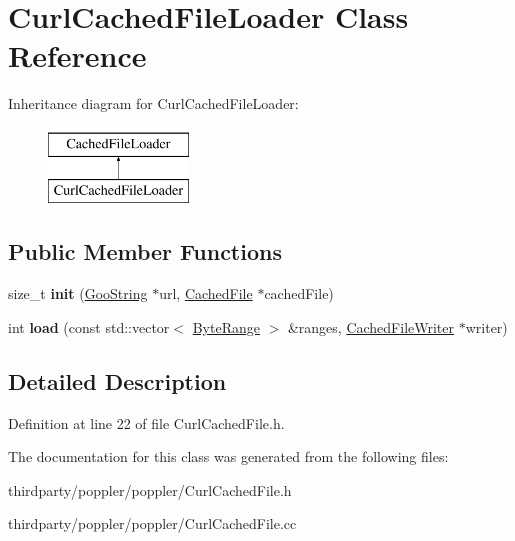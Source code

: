 \hypertarget{class_curl_cached_file_loader}{}\section{Curl\+Cached\+File\+Loader Class Reference}
\label{class_curl_cached_file_loader}
Inheritance diagram for Curl\+Cached\+File\+Loader\+:\begin{figure}[H]
\begin{center}
\leavevmode
\includegraphics[height=2.000000cm]{class_curl_cached_file_loader}
\end{center}
\end{figure}
\subsection*{Public Member Functions}
\begin{DoxyCompactItemize}
\item 
\mbox{\label{class_curl_cached_file_loader_ab60dd9e0caf2508305bee09c154075ce}} 
size\+\_\+t {\bfseries init} (\hyperlink{class_goo_string}{Goo\+String} $\ast$url, \hyperlink{class_cached_file}{Cached\+File} $\ast$cached\+File)
\item 
\mbox{\label{class_curl_cached_file_loader_ad18cab1abfc69655b31c17bec2c8e134}} 
int {\bfseries load} (const std\+::vector$<$ \hyperlink{struct___byte_range}{Byte\+Range} $>$ \&ranges, \hyperlink{class_cached_file_writer}{Cached\+File\+Writer} $\ast$writer)
\end{DoxyCompactItemize}


\subsection{Detailed Description}


Definition at line 22 of file Curl\+Cached\+File.\+h.



The documentation for this class was generated from the following files\+:\begin{DoxyCompactItemize}
\item 
thirdparty/poppler/poppler/Curl\+Cached\+File.\+h\item 
thirdparty/poppler/poppler/Curl\+Cached\+File.\+cc\end{DoxyCompactItemize}

